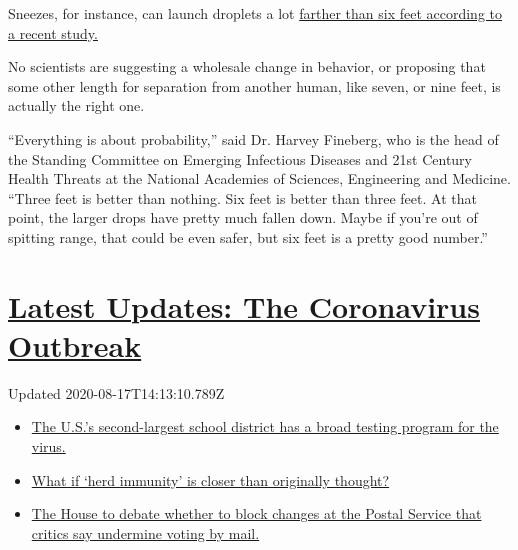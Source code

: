 Sneezes, for instance, can launch droplets a lot
\href{https://jamanetwork.com/journals/jama/fullarticle/2763852}{farther
than six feet according to a recent study.}

No scientists are suggesting a wholesale change in behavior, or
proposing that some other length for separation from another human, like
seven, or nine feet, is actually the right one.

``Everything is about probability,'' said Dr. Harvey Fineberg, who is
the head of the Standing Committee on Emerging Infectious Diseases and
21st Century Health Threats at the National Academies of Sciences,
Engineering and Medicine. ``Three feet is better than nothing. Six feet
is better than three feet. At that point, the larger drops have pretty
much fallen down. Maybe if you're out of spitting range, that could be
even safer, but six feet is a pretty good number.''

\hypertarget{latest-updates-the-coronavirus-outbreak}{%
\section{\texorpdfstring{\href{https://www.nytimes.com/2020/08/17/world/covid-19-coronavirus.html?action=click\&pgtype=Article\&state=default\&region=MAIN_CONTENT_1\&context=storylines_live_updates}{Latest
Updates: The Coronavirus
Outbreak}}{Latest Updates: The Coronavirus Outbreak}}\label{latest-updates-the-coronavirus-outbreak}}

Updated 2020-08-17T14:13:10.789Z

\begin{itemize}
\tightlist
\item
  \href{https://www.nytimes.com/2020/08/17/world/covid-19-coronavirus.html?action=click\&pgtype=Article\&state=default\&region=MAIN_CONTENT_1\&context=storylines_live_updates\#link-237e9e78}{The
  U.S.'s second-largest school district has a broad testing program for
  the virus.}
\item
  \href{https://www.nytimes.com/2020/08/17/world/covid-19-coronavirus.html?action=click\&pgtype=Article\&state=default\&region=MAIN_CONTENT_1\&context=storylines_live_updates\#link-57383ec3}{What
  if `herd immunity' is closer than originally thought?}
\item
  \href{https://www.nytimes.com/2020/08/17/world/covid-19-coronavirus.html?action=click\&pgtype=Article\&state=default\&region=MAIN_CONTENT_1\&context=storylines_live_updates\#link-530abd6a}{The
  House to debate whether to block changes at the Postal Service that
  critics say undermine voting by mail.}
\end{itemize}

